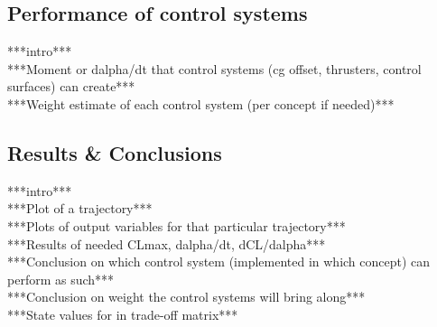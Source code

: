 \subsection{Performance of control systems}
***intro***\\
***Moment or dalpha/dt that control systems (cg offset, thrusters, control surfaces) can create***\\
***Weight estimate of each control system (per concept if needed)***\\

\subsection{Results \& Conclusions}
***intro***\\
***Plot of a trajectory***\\
***Plots of output variables for that particular trajectory***\\
***Results of needed CLmax, dalpha/dt, dCL/dalpha***\\
***Conclusion on which control system (implemented in which concept) can perform as such***\\
***Conclusion on weight the control systems will bring along***\\
***State values for in trade-off matrix***\\